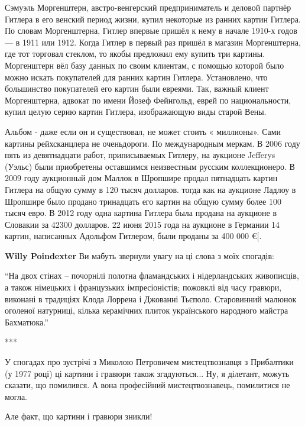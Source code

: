 \begin{itemize}

Сэмуэль Моргенштерн, австро-венгерский предприниматель и деловой партнёр
Гитлера в его венский период жизни, купил некоторые из ранних картин Гитлера.
По словам Моргенштерна, Гитлер впервые пришёл к нему в начале 1910-х годов — в
1911 или 1912. Когда Гитлер в первый раз пришёл в магазин Моргенштерна, где тот
торговал стеклом, то якобы предложил ему купить три картины. Моргенштерн вёл
базу данных по своим клиентам, с помощью которой было можно искать покупателей
для ранних картин Гитлера. Установлено, что большинство покупателей его картин
были евреями. Так, важный клиент Моргенштерна, адвокат по имени Йозеф
Фейнгольд, еврей по национальности, купил целую серию картин Гитлера,
изображающую виды старой Вены.



Альбом - даже если он и существовал, не может стоить « миллионы». Сами
картины рейхсканцлера не оченьдороги. По международным меркам. В 2006 году пять
из девятнадцати работ, приписываемых Гитлеру, на аукционе Jefferys (Уэльс) были
приобретены оставшимся неизвестным русским коллекционеро. В 2009 году
аукционный дом Маллок в Шропшире продал пятнадцать картин Гитлера на общую
сумму в 120 тысяч долларов. тогда как на аукционе Ладлоу в Шропшире было
продано тринадцать его картин на общую сумму более 100 тысяч евро. В 2012 году
одна картина Гитлера была продана на аукционе в Словакии за 42300 долларов. 22
июня 2015 года на аукционе в Германии 14 картин, написанных Адольфом Гитлером,
были проданы за 400 000 €[.

\begin{itemize} %
\textbf{Willy Poindexter} Ви мабуть звернули увагу на ці слова з моїх спогадів:

\enquote{На двох стінах – почорнілі полотна фламандських і нідерландських
живописців, а також німецьких і французьких імпресіоністів; пожовклі від часу
гравюри, виконані в традиціях Клода Лоррена і Джованні Тьєполо. Старовинний
малюнок оголеної натурниці, кілька керамічних плиток українського народного
майстра Бахматюка.}

***

У спогадах про зустрічі з Миколою Петровичем мистецтвознавця з Прибалтики (у
1977 році) ці картини і гравюри також згадуються... Ну, я ділетант, можуть
сказати, що помилився. А вона професійний мистецтвознавець, помилитися не
могла.

Але факт, що картини і гравюри зникли!


\end{itemize}
\end{itemize}
